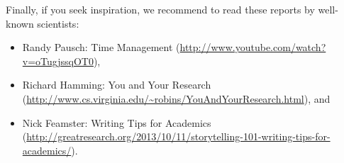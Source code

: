 Finally, if you seek inspiration, we recommend to read these reports by well-known scientists:
\begin{itemize}
\item Randy Pausch: Time Management (\url{http://www.youtube.com/watch?v=oTugjssqOT0}),
\item Richard Hamming: You and Your Research (\url{http://www.cs.virginia.edu/~robins/YouAndYourResearch.html}), and
\item Nick Feamster: Writing Tips for Academics (\url{http://greatresearch.org/2013/10/11/storytelling-101-writing-tips-for-academics/}).
\end{itemize}
